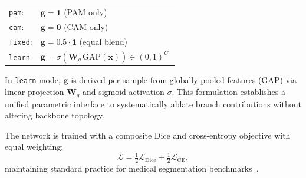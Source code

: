 \begin{center}
\small
\begin{tabular}{@{}ll@{}}
\texttt{pam}:   & $\mathbf{g} = \mathbf{1}$ \quad (PAM only) \\
\texttt{cam}:   & $\mathbf{g} = \mathbf{0}$ \quad (CAM only) \\
\texttt{fixed}: & $\mathbf{g} = 0.5\cdot\mathbf{1}$ \quad (equal blend) \\
\texttt{learn}: & $\mathbf{g} = \sigma(\mathbf{W}_g\,\mathrm{GAP}(\mathbf{x})) \in (0,1)^{C'}$ \\
\end{tabular}
\end{center}

In \texttt{learn} mode, $\mathbf{g}$ is derived per sample from globally pooled features ($\mathrm{GAP}$) via linear projection $\mathbf{W}_g$ and sigmoid activation $\sigma$. This formulation establishes a unified parametric interface to systematically ablate branch contributions without altering backbone topology.

The network is trained with a composite Dice and cross-entropy objective with equal weighting:
\begin{equation}
  \mathcal{L} = \tfrac{1}{2}\mathcal{L}_{\text{Dice}} + \tfrac{1}{2}\mathcal{L}_{\text{CE}},
  \label{eq:loss}
\end{equation}
maintaining standard practice for medical segmentation benchmarks~\cite{chen2021transunet,sun2024datransunet}.
